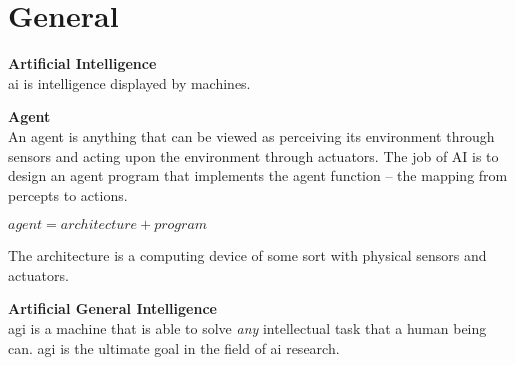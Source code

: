 \section{General}

\textbf{Artificial Intelligence} \\
\acrfull{ai} is intelligence displayed by machines. 

\textbf{Agent} \\
An agent is anything that can be viewed as perceiving its environment through sensors and acting upon the environment through actuators. The job of AI is to design an agent program that implements the agent function – the mapping from percepts to actions. \\

\centerline{$agent = architecture + program$}

The architecture is a computing device of some sort with physical sensors and actuators. 

\textbf{Artificial General Intelligence} \\
\acrfull{agi} is a machine that is able to solve \textit{any} intellectual task that a human being can. \acrshort{agi} is the ultimate goal in the field of \acrshort{ai} research. 


